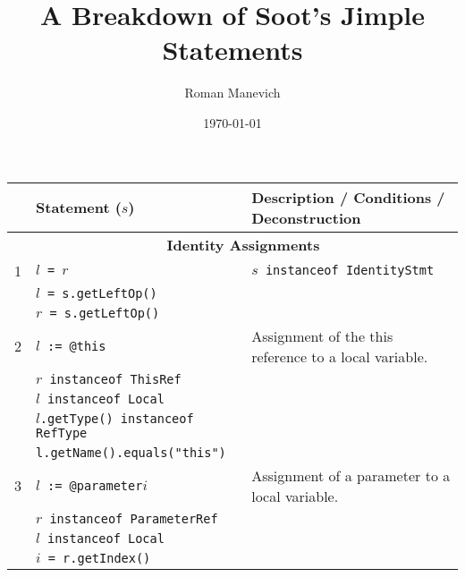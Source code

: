\documentclass{article}
\title{A Breakdown of Soot's Jimple Statements}
\date{\today}
\author{Roman Manevich}
\makeatletter
\newcommand{\This}{@\texttt{this}}
\newcommand{\Parameter}{@\texttt{parameter}}
\makeatother
\begin{document}
\maketitle


\begin{scriptsize}
\begin{tabular}{lll}
\hline
& \textbf{Statement} ($s$)      & \textbf{Description / Conditions / Deconstruction}\\
\hline
\hline
& \multicolumn{2}{c}{\textbf{Identity Assignments}}\\
1 & \texttt{$l$ = $r$}           & \texttt{$s$ instanceof IdentityStmt}\\
                & \texttt{$l$ = s.getLeftOp()} \\
                & \texttt{$r$ = s.getLeftOp()} \\
\hline
2 & \texttt{$l$ := \This}   & Assignment of the this reference to a local variable.\\
   & \texttt{$r$ instanceof ThisRef}\\
   & \texttt{$l$ instanceof Local}\\
   & \texttt{$l$.getType() instanceof RefType}\\
   & \texttt{l.getName().equals("this")}\\
\hline
3 & \texttt{$l$ := \Parameter $i$}   & Assignment of a parameter to a local variable.\\
   & \texttt{$r$ instanceof ParameterRef}\\
   & \texttt{$l$ instanceof Local}\\
   & \texttt{$i$ = r.getIndex()}\\
\hline
\hline
\end{tabular}
\end{scriptsize}
\end{document}
